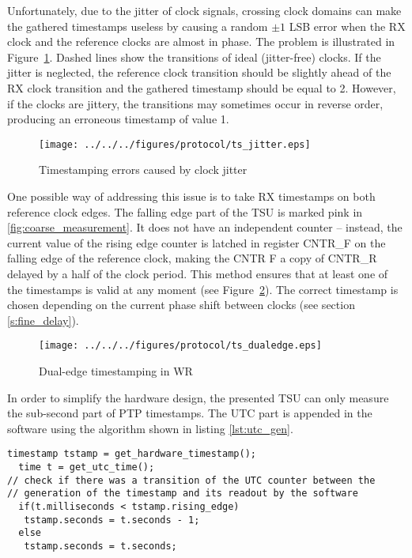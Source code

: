 Unfortunately, due to the jitter of clock signals, crossing clock domains
can make the gathered timestamps useless by causing a random $\pm 1$ LSB
error when the RX clock and the reference clocks are almost in phase. The
problem is illustrated in Figure~\ref{fig:ts_jitter}.  Dashed lines show
the transitions of ideal (jitter-free) clocks. If the jitter is neglected,
the reference clock transition should be slightly ahead of the RX clock
transition and the gathered timestamp should be equal to 2. However, if the
clocks are jittery, the transitions may sometimes occur in reverse order,
producing an erroneous timestamp of value 1.
\begin{figure}[ht!]
  \centering
  \texttt{[image: ../../../figures/protocol/ts\_jitter.eps]}
  \caption{Timestamping errors caused by clock jitter}
  \label{fig:ts_jitter}
\end{figure}
One possible way of addressing this issue is to take RX timestamps on both
reference clock edges. The falling edge part of the TSU is marked pink in
\ref{fig:coarse_measurement}. It does not have an independent counter --
instead, the current value of the rising edge counter is latched in register
CNTR\_F on the falling edge of the reference clock, making the CNTR\us
F a copy of CNTR\_R delayed by a half of the clock period. This method
ensures that at least one of the timestamps is valid at any moment 
(see Figure~\ref{fig:ts_dualedge}). The correct timestamp is chosen depending on the
current phase shift between clocks (see section \ref{s:fine_delay}).
\begin{figure}[ht!]
  \centering
  \texttt{[image: ../../../figures/protocol/ts\_dualedge.eps]}
  \caption{Dual-edge timestamping in WR}
  \label{fig:ts_dualedge}
\end{figure}
In order to simplify the hardware design, the presented TSU can only measure
the sub-second part of PTP timestamps. The UTC part is appended in the
software using the algorithm shown in listing \ref{lst:utc_gen}.
\begin{lstlisting}[caption=Producing UTC timestamps,label=lst:utc_gen]
  timestamp tstamp = get_hardware_timestamp();
  time t = get_utc_time();
// check if there was a transition of the UTC counter between the
// generation of the timestamp and its readout by the software
  if(t.milliseconds < tstamp.rising_edge)
   tstamp.seconds = t.seconds - 1;
  else
   tstamp.seconds = t.seconds;
\end{lstlisting}


